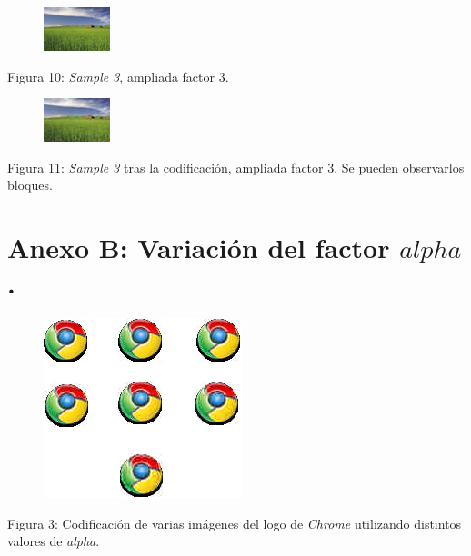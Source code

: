\documentclass[%
final,
%
reprint,
%
notitlepage,
narroweqnarray,
inline,
twoside,
invited
]{ieee}
\begin{document}
\begin{figure}[H]
	\begin{center}
	\includegraphics[scale=3]{./img/sample_3_in.jpg}
	\end{center}
\end{figure}
\begin{center}
\par Figura 10: \textit{Sample 3}, ampliada factor 3.
\end{center}

\begin{figure}[H]
	\begin{center}
	\includegraphics[scale=3]{./img/sample_3_alpha_1_out.jpg}
	\end{center}
\end{figure}
\begin{center}
\par Figura 11: \textit{Sample 3} tras la codificación, ampliada factor 3. Se pueden observarlos bloques.
\end{center}

\section*{Anexo B: Variación del factor $alpha$.}

\begin{figure}[H]
	\begin{center}
	\includegraphics[scale=2.3]{./img/chromes.png}
	\end{center}
\end{figure}
\begin{center}
\par Figura 3: Codificación de varias imágenes del logo de \textit{Chrome} utilizando distintos valores de \textit{alpha}.
\end{center}
\end{document}
